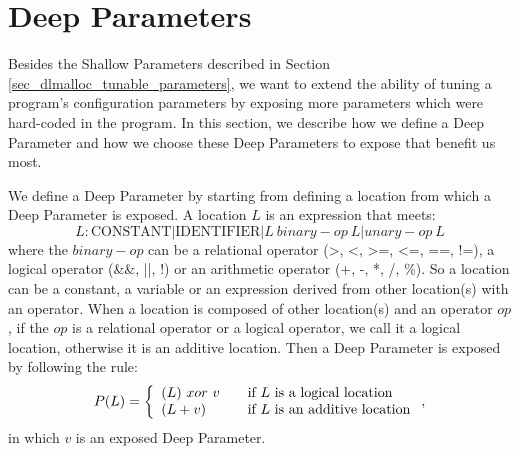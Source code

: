 \section{Deep Parameters}
Besides the Shallow Parameters described in Section \ref{sec_dlmalloc_tunable_parameters}, we want to extend the ability of tuning a program's configuration parameters by exposing more parameters which were hard-coded in the program. In this section, we describe how we define a Deep Parameter and how we choose these Deep Parameters to expose that benefit us most. 

We define a Deep Parameter by starting from defining a location from which a Deep Parameter is exposed. A location $L$ is an expression that meets:
\begin{equation}
L: \mbox{CONSTANT} | \mbox{IDENTIFIER} | L\ binary-op\ L | unary-op\ L
\end{equation}
where the $binary-op$ can be a relational operator (>, <, >=, <=, ==, !=), a logical operator (\&\&, ||, !) or an arithmetic operator (+, -, *, /, \%). So a location can be a constant, a variable or an expression derived from other location(s) with an operator. When a location is composed of other location(s) and an operator $op$, if the $op$ is a relational operator or a logical operator, we call it a logical location, otherwise it is an additive location. Then a Deep Parameter is exposed by following the rule:
\begin{equation}
 P(L) = \left\{
  \begin{array}{l l}
    (L) \ xor \ v & \quad \text{if $L$ is a logical location}\\
    (L + v) & \quad \text{if $L$ is an additive location}
  \end{array} \right.,
\end{equation}
in which $v$ is an exposed Deep Parameter. 

